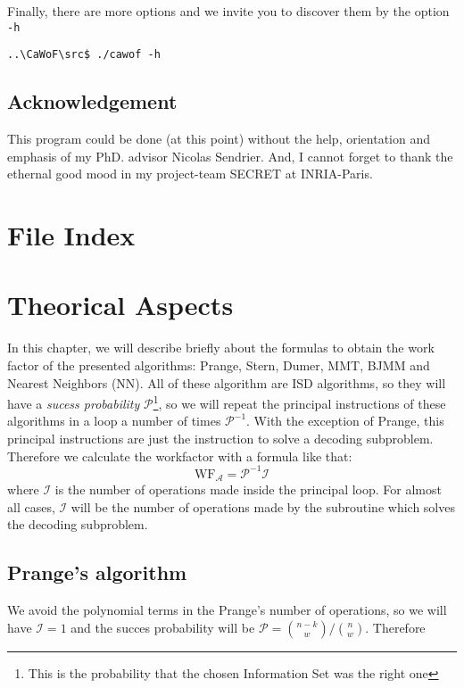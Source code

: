 \documentclass[a4paper]{book}
\newcommand{\WF}{\mathrm{WF}}
\begin{document}
Finally, there are more options and we invite you to discover them by the option \verb+-h+

{\footnotesize
\verb+..\CaWoF\src$ ./cawof -h+
}

\section{Acknowledgement}

This program could be done (at this point) without the help, orientation and emphasis of my PhD. advisor Nicolas Sendrier. And, I cannot forget to thank the ethernal good mood in my project-team SECRET at INRIA-Paris. 

\chapter{\-File \-Index}


\chapter{Theorical Aspects}

In this chapter, we will describe briefly about the formulas to obtain the work factor of the presented algorithms: Prange, Stern, Dumer, MMT, BJMM and Nearest Neighbors (NN).  
All of these algorithm are ISD algorithms, so they will have a \emph{sucess probability} $\mathcal{P}$\footnote{This is the probability that the chosen Information Set was the right one}, so we will repeat the principal instructions of these algorithms in a loop a number of times $\mathcal{P}^{-1}$. With the exception of Prange, this principal instructions are just the instruction to solve a decoding subproblem. Therefore we calculate the workfactor with a formula like that:
$$ \WF_{\mathcal{A}}=\mathcal{P}^{-1} \mathcal{I} $$
where $\mathcal{I}$ is the number of operations made inside the principal loop. For almost all cases, $\mathcal{I}$ will be the number of operations made by the subroutine which  solves the decoding subproblem. 


\section{Prange's algorithm}

We avoid the polynomial terms in the Prange's number of operations, so we will have $\mathcal{I}=1$ and the succes probability will be $\mathcal{P} =\binom{n-k}{w}/\binom{n}{w}$. Therefore
\end{document}
